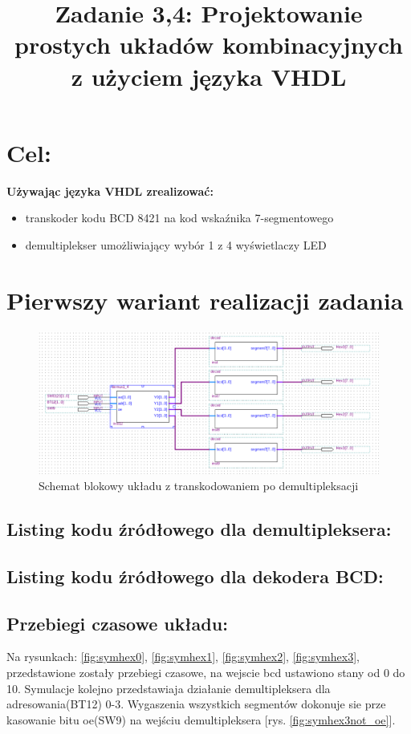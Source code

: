 \documentclass{classrep}
\author{
  \studentinfo{Witold Olechowski}{127517} \and
  \studentinfo{Tomasz Marecik}{127374}
}
\title{Zadanie 3,4: Projektowanie prostych układów kombinacyjnych z użyciem języka VHDL }
\begin{document}
\maketitle

\section{Cel:}
\textbf{Używając języka VHDL zrealizować:}
\begin{itemize}
	\item transkoder kodu BCD 8421 na kod wskaźnika 7-segmentowego
	\item demultiplekser umożliwiający wybór 1 z 4 wyświetlaczy LED
\end{itemize}

\section{Pierwszy wariant realizacji zadania}
\label{sec:pierw}
\begin{figure}[H]
	\centering
	\includegraphics[width=1.0\linewidth]{block_bcd_segment}
	\caption{Schemat blokowy układu z transkodowaniem po demultipleksacji}
	\label{fig:block_bcd_segment}
\end{figure}

\subsection{Listing kodu źródłowego dla demultipleksera:}
\label{ssec:lkzd}
	

\subsection{Listing kodu źródłowego dla dekodera BCD:}
	

\subsection{Przebiegi czasowe układu:}
Na rysunkach:  \ref{fig:symhex0}, \ref{fig:symhex1}, \ref{fig:symhex2}, \ref{fig:symhex3}, przedstawione zostały przebiegi czasowe, na wejscie bcd ustawiono stany od 0 do 10. Symulacje kolejno przedstawiaja działanie demultipleksera dla adresowania(BT12) 0-3. Wygaszenia wszystkich segmentów dokonuje sie prze kasowanie bitu oe(SW9) na wejściu demultipleksera [rys. \ref{fig:symhex3not_oe}].
\end{document}
